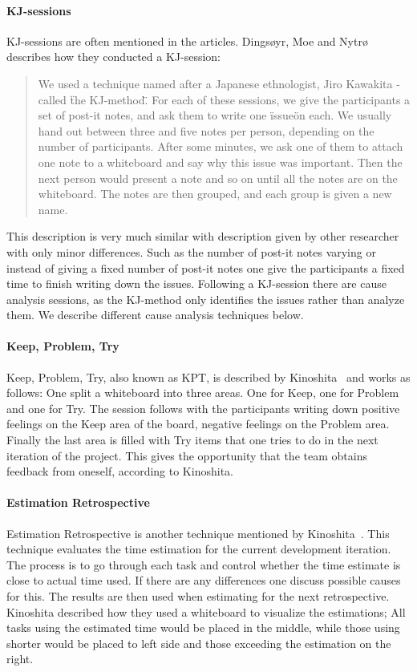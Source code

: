 \documentclass[12pt]{article}
\begin{document}
\paragraph{KJ-sessions}
KJ-sessions are often mentioned in the articles. Dingsøyr, Moe and Nytrø~\cite{Moe2001} describes how they conducted a KJ-session: 
\begin{quote} We used a technique named after a Japanese ethnologist, Jiro Kawakita - called \"the KJ-method\". For each of these sessions, we give the participants a set of post-it notes, and ask them to write one \"issue\" on each. We usually hand out between three and five notes per person, depending on the number of participants. After some minutes, we ask one of them to attach one note to a whiteboard and say why this issue was important. Then the next person would present a note and so on until all the notes are on the whiteboard. The notes are then grouped, and each group is given a new name. 
\end{quote}
This description is very much similar with description given by other researcher with only minor differences. Such as the number of post-it notes varying or instead of giving a fixed number of post-it notes one give the participants a fixed time to finish writing down the issues. Following a KJ-session there are cause analysis sessions, as the KJ-method only identifies the issues rather than analyze them. We describe different cause analysis techniques below. 

\paragraph{Keep, Problem, Try}
Keep, Problem, Try, also known as KPT, is described by Kinoshita~\cite{Kinoshita2008} and works as follows: One split a whiteboard into three areas. One for Keep, one for Problem and one for Try. The session follows with the participants writing down positive feelings on the Keep area of the board, negative feelings on the Problem area. Finally the last area is filled with Try items that one tries to do in the next iteration of the project. This gives the opportunity that the team obtains feedback from oneself, according to Kinoshita. 

\paragraph{Estimation Retrospective}
Estimation Retrospective is another technique mentioned by Kinoshita~\cite{Kinoshita2008}. This technique evaluates the time estimation for the current development iteration. The process is to go through each task and control whether the time estimate is close to actual time used. If there are any differences one discuss possible causes for this. The results are then used when estimating for the next retrospective. Kinoshita described how they used a whiteboard to visualize the estimations; All tasks using the estimated time would be placed in the middle, while those using shorter would be placed to left side and those exceeding the estimation on the right. 
\end{document}
